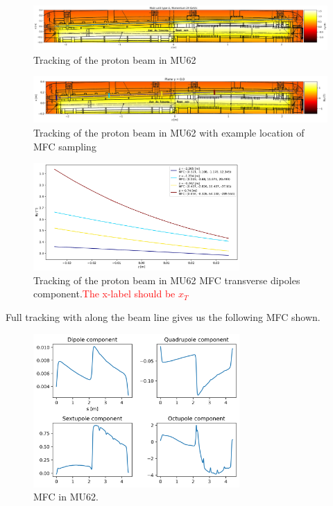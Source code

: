 \begin{figure}[H]
\centering
\includegraphics[width=1.0\textwidth]{02_Simulation/images/track_mu62.png}
\caption{Tracking of the proton beam in MU62}
\label{fig:track_mu62}
\end{figure}

\begin{figure}[H]
\centering
\includegraphics[width=1.0\textwidth]{02_Simulation/images/track_mu62_2.png}
\caption{Tracking of the proton beam in MU62 with example location of MFC sampling}
\label{fig:track_mu62_2}
\end{figure}

\begin{figure}[H]
\centering
\includegraphics[width=0.7\textwidth]{02_Simulation/images/track_mu62_2_mfc.png}
\caption{Tracking of the proton beam in MU62 MFC transverse dipoles component.\textcolor{red}{The x-label should be $x_{T}$} }
\label{fig:track_mu62_2_mfc}
\end{figure}

Full tracking with along the beam line gives us the following MFC shown.

\begin{figure}[H]
\centering
\includegraphics[width=0.7\textwidth]{02_Simulation/images/mfc_mu62.png}
\caption{MFC in MU62.}
\label{fig:mfc_mu62}
\end{figure}

